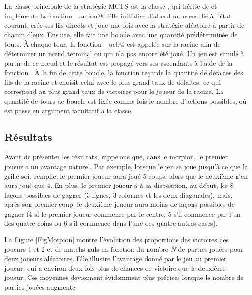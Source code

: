 \documentclass[a4paper,12pt]{article}
\begin{document}
La classe principale de la stratégie MCTS est la classe \verb@AgentMCTS@, qui hérite de \verb@Agent@ et implémente la fonction \verb@get_action@. Elle initialise d'abord un n\oe{}ud \verb@racine@ lié à l'état courant, crée ses fils directs et joue une fois avec la stratégie aléatoire à partir de chacun d'eux. Ensuite, elle fait une boucle avec une quantité prédéterminée de tours. À chaque tour, la fonction \verb@choix_ucb@ est appelée sur la racine afin de déterminer un n\oe{}ud terminal ou qui n'a pas encore été joué. Un jeu est simulé à partir de ce n\oe{}ud et le résultat est propagé vers ses ascendants à l'aide de la fonction \verb@maj@. À la fin de cette boucle, la fonction regarde la quantité de défaites des fils de la racine et choisit celui avec le plus grand taux de défaites, ce qui correspond au plus grand taux de victoires pour le joueur de la racine. La quantité de tours de boucle est fixée comme \verb@n@ fois le nombre d'actions possibles, où \verb@n@ est passé en argument facultatif à la classe.

\subsection{Résultats}

Avant de présenter les résultats, rappelons que, dans le morpion, le premier joueur a un avantage naturel. Par exemple, lorsque le jeu se joue jusqu'à ce que la grille soit remplie, le premier joueur aura joué 5 coups, alors que le deuxième n'en aura joué que 4. En plus, le premier joueur a à sa disposition, au début, les 8 façons possibles de gagner (3 lignes, 3 colonnes et les deux diagonales), mais, après son premier coup, le deuxième joueur aura moins de façons possibles de gagner (4 si le premier joueur commence par le centre, 5 s'il commence par l'un des quatre coins ou 6 s'il commence dans l'une des quatre autres cases).

La Figure \ref{FigMorpion} montre l'évolution des proportions des victoires des joueurs 1 et 2 et de matchs nuls en fonction du nombre $N$ de parties jouées pour deux joueurs aléatoires. Elle illustre l'avantage donné par le jeu au premier joueur, qui a environ deux fois plus de chances de victoire que le deuxième joueur. Ces moyennes deviennent évidemment plus précises lorsque le nombre de parties jouées augmente.
\end{document}
